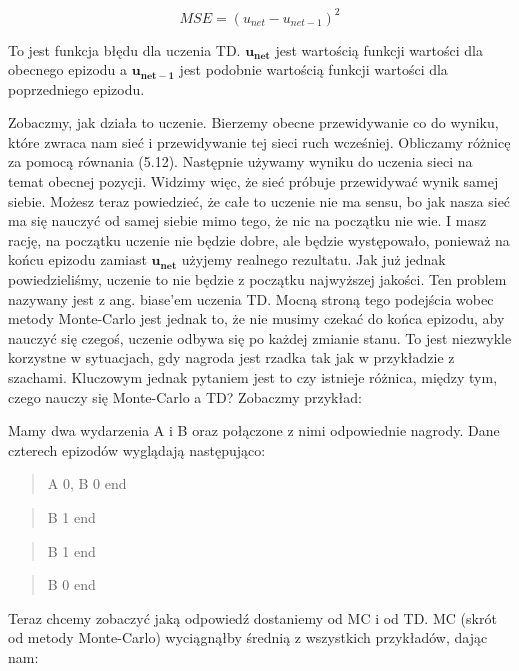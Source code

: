 \begin{equation}
MSE = (u_{net} - u_{net-1})^2
\end{equation}

\noindent To jest funkcja błędu dla uczenia TD. $\boldsymbol{u_{net}}$ jest wartością funkcji wartości dla obecnego epizodu a $\boldsymbol{u_{net-1}}$ jest podobnie wartością funkcji wartości dla poprzedniego epizodu.\newline

Zobaczmy, jak działa to uczenie. Bierzemy obecne przewidywanie co do wyniku, które zwraca nam sieć i przewidywanie tej sieci ruch wcześniej. Obliczamy różnicę za pomocą równania (5.12). Następnie używamy wyniku do uczenia sieci na temat obecnej pozycji. Widzimy więc, że sieć próbuje przewidywać wynik samej siebie. Możesz teraz powiedzieć, że całe to uczenie nie ma sensu, bo jak nasza sieć ma się nauczyć od samej siebie mimo tego, że nic na początku nie wie. I masz rację, na początku uczenie nie będzie dobre, ale będzie występowało, ponieważ na końcu epizodu zamiast $\boldsymbol{u_{net}}$ użyjemy realnego rezultatu. Jak już jednak powiedzieliśmy, uczenie to nie będzie z początku najwyższej jakości. Ten problem nazywany jest z ang. biase’em uczenia TD. Mocną stroną tego podejścia wobec metody Monte-Carlo jest jednak to, że nie musimy czekać do końca epizodu, aby nauczyć się czegoś, uczenie odbywa się po każdej zmianie stanu. To jest niezwykle korzystne w sytuacjach, gdy nagroda jest rzadka tak jak w przykładzie z szachami. Kluczowym jednak pytaniem jest to czy istnieje różnica, między tym, czego nauczy się Monte-Carlo a TD? Zobaczmy przykład:\newline

\noindent Mamy dwa wydarzenia A i B oraz połączone z nimi odpowiednie nagrody. Dane czterech epizodów wyglądają następująco:

\begin{quote}
A 0, B 0 end
\end{quote}
\begin{quote}
B 1 end
\end{quote}
\begin{quote}
B 1 end
\end{quote}
\begin{quote}
B 0 end
\end{quote}

\noindent Teraz chcemy zobaczyć jaką odpowiedź dostaniemy od MC i od TD. MC (skrót od metody Monte-Carlo) wyciągnąłby średnią z wszystkich przykładów, dając nam:

